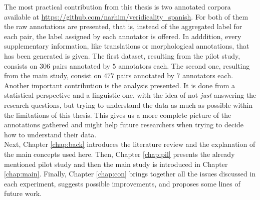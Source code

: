 The most practical contribution from this thesis is two annotated corpora available at \url{https://github.com/narhim/veridicality_spanish}. For both of them the raw annotations are presented, that is, instead of the aggregated label for each pair, the label assigned by each annotator is offered. In adddition, every supplementary information, like translations or morphological annotations, that has been generated is given. The first dataset, resulting from the pilot study, consists on $306$ pairs annotated by $5$ annotators each. The second one, resulting from the main study, consist on $477$ pairs annotated by $7$ annotators each.\\

Another important contribution is the analysis presented. It is done from a statistical perspective and a linguistic one, with the idea of not \textit{just} answering the research questions, but trying to understand the data as much as possible within the limitations of this thesis. This gives us a more complete picture of the annotations gathered and might help future researchers when trying to decide how to understand their data.\\ 

Next, Chapter \ref{chap:back} introduces the literature review and the explanation of the main concepts used here. Then, Chapter \ref{chap:pil} presents the already mentioned pilot study and then the main study is introduced in Chapter \ref{chap:main}. Finally, Chapter \ref{chap:con} brings together all the issues discussed in each experiment, suggests possible improvements, and proposes some lines of future work.\\
